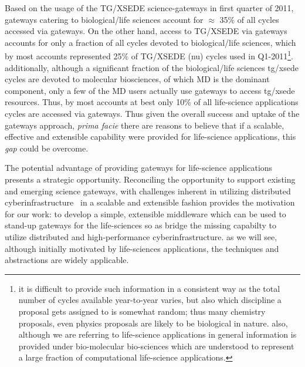 \documentclass[]{svjour3}
\begin{document}
Based on the usage of the TG/XSEDE science-gateways in first quarter
of 2011, gateways catering to biological/life sciences account for
$\approx$ 35\% of all cycles accessed via gateways.  On the other
hand, access to TG/XSEDE via gateways accounts for only a fraction of
all cycles devoted to biological/life sciences, which by most accounts
represented 25\% of TG/XSEDE (nu) cycles used in Q1-2011\footnote{it
  is difficult to provide such information in a consistent way as the
  total number of cycles available year-to-year varies, but also which
  discipline a proposal gets assigned to is somewhat random; thus many
  chemistry proposals, even physics proposals are likely to be
  biological in nature. also, although we are referring to
  life-science applications in general information is provided under
  bio-molecular bio-sciences which are understood to represent a large
  fraction of computational life-science applications.}.
additionally, although a significant fraction of the biological/life
sciences tg/xsede cycles are devoted to molecular biosciences, of
which MD is the dominant component, only a few of the MD users
actually use gateways to access tg/xsede resources. Thus, by most
accounts at best only 10\% of all life-science applications cycles are
accessed via
gateways.  %
Thus given the overall success and uptake of the gateways approach,
{\it prima facie} there are reasons to believe that if a scalable,
effective and extensible capability were provided for life-science
applications, this {\it gap} could be overcome.
 
The potential advantage of providing gateways for life-science
applications presents a strategic opportunity.  Reconciling the
opportunity to support existing and emerging science gateways, with
challenges inherent in utilizing distributed
cyberinfrastructure~\cite{dpa-surveypaper} in a scalable and
extensible fashion provides the motivation for our work: to develop a
simple, extensible middleware which can be used to stand-up gateways
for the life-sciences so as bridge the missing capabilty to utilize
distributed and high-performance cyberinfrastructure. as we will see,
although initially motivated by life-sciences applications, the
techniques and abstractions are widely applicable.
\end{document}
